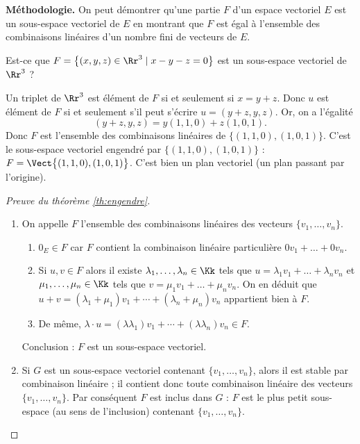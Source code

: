 \documentclass[class=report,crop=false]{standalone}
\begin{document}
\bigskip


\textbf{Méthodologie.}
On peut démontrer qu'une partie $F$ d'un espace
vectoriel $E$ est un sous-espace vectoriel de $E$ en
montrant que $F$ est égal à l'ensemble des combinaisons
linéaires d'un nombre fini de vecteurs de $E$.


\begin{exemple}
Est-ce que $F=\big\{(x,y,z) \in \Rr^3 \mid x-y-z=0\big\}$ est
un sous-espace vectoriel de $\Rr^3$ ?

Un triplet de $\Rr^3$ est élément de $F$ si et seulement si $x=y+z.$
Donc $u$ est élément de $F$ si et seulement s'il peut s'écrire
$u=(y+z, y, z)$. Or, on a l'égalité
$$(y+z, y, z)=y(1,1,0)+z(1,0,1).$$
Donc $F$ est l'ensemble des combinaisons linéaires de $\big\{(1,1,0), (1,0,1) \big\}$.
C'est le sous-espace vectoriel engendré par $\big\{(1,1,0), (1,0,1) \big\}$ :
$F = \Vect \big\{(1,1,0), (1,0,1) \big\}$. C'est bien un plan vectoriel (un plan passant par l'origine).
\end{exemple}



\begin{proof}[Preuve du théorème \ref{th:engendre}]
~
\begin{enumerate}
  \item On appelle $F$ l'ensemble des combinaisons linéaires des vecteurs
$\{v_1, \dots , v_n\}$.
  \begin{enumerate}
    \item $0_E \in F$ car $F$ contient la combinaison linéaire particulière
$0v_1+ \dots +0v_n$.

    \item Si $u, v \in F$ alors il existe $\lambda_1,\ldots,\lambda_n \in \Kk$
    tels que $u=\lambda_1v_1+ \dots+\lambda_nv_n$ et
    $\mu_1,\ldots,\mu_n \in \Kk$ tels que $v=\mu_1v_1+ \dots+\mu_nv_n$.
    On en déduit que $u+v=(\lambda_1+\mu_1)v_1+ \cdots+(\lambda_n+\mu_n)v_n$
    appartient bien à $F$.

    \item De même, $\lambda \cdot u = (\lambda\lambda_1) v_1 + \cdots +
    (\lambda\lambda_n) v_n \in F$.
  \end{enumerate}
 Conclusion : $F$ est un sous-espace vectoriel.

  \item Si $G$ est un sous-espace vectoriel contenant  $\{v_1, \dots , v_n\}$,
alors il est stable par combinaison linéaire ; il contient donc
toute combinaison linéaire des vecteurs $\{v_1, \dots , v_n\}$.
Par conséquent $F$ est inclus dans $G$ : $F$ est le plus petit sous-espace
(au sens de l'inclusion) contenant  $\{v_1, \dots , v_n\}$.
\end{enumerate}
\end{proof}
\end{document}
